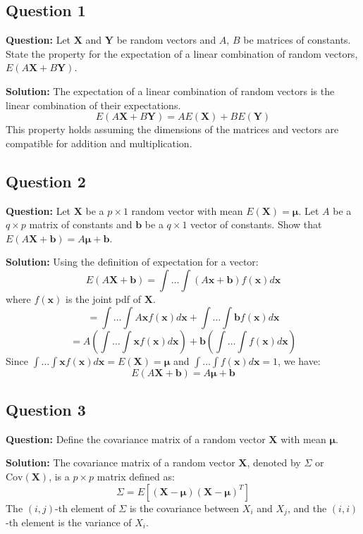 \subsection*{Question 1}
\textbf{Question:} Let $\mathbf{X}$ and $\mathbf{Y}$ be random vectors and $A$, $B$ be matrices of constants. State the property for the expectation of a linear combination of random vectors, $E(A\mathbf{X} + B\mathbf{Y})$.

\textbf{Solution:}
The expectation of a linear combination of random vectors is the linear combination of their expectations.
$$ E(A\mathbf{X} + B\mathbf{Y}) = A E(\mathbf{X}) + B E(\mathbf{Y}) $$
This property holds assuming the dimensions of the matrices and vectors are compatible for addition and multiplication.

\subsection*{Question 2}
\textbf{Question:} Let $\mathbf{X}$ be a $p \times 1$ random vector with mean $E(\mathbf{X}) = \boldsymbol{\mu}$. Let $A$ be a $q \times p$ matrix of constants and $\mathbf{b}$ be a $q \times 1$ vector of constants. Show that $E(A\mathbf{X} + \mathbf{b}) = A\boldsymbol{\mu} + \mathbf{b}$.

\textbf{Solution:}
Using the definition of expectation for a vector:
$$ E(A\mathbf{X} + \mathbf{b}) = \int \dots \int (A\mathbf{x} + \mathbf{b}) f(\mathbf{x}) d\mathbf{x} $$
where $f(\mathbf{x})$ is the joint pdf of $\mathbf{X}$.
$$ = \int \dots \int A\mathbf{x} f(\mathbf{x}) d\mathbf{x} + \int \dots \int \mathbf{b} f(\mathbf{x}) d\mathbf{x} $$
$$ = A \left( \int \dots \int \mathbf{x} f(\mathbf{x}) d\mathbf{x} \right) + \mathbf{b} \left( \int \dots \int f(\mathbf{x}) d\mathbf{x} \right) $$
Since $\int \dots \int \mathbf{x} f(\mathbf{x}) d\mathbf{x} = E(\mathbf{X}) = \boldsymbol{\mu}$ and $\int \dots \int f(\mathbf{x}) d\mathbf{x} = 1$, we have:
$$ E(A\mathbf{X} + \mathbf{b}) = A\boldsymbol{\mu} + \mathbf{b} $$

\subsection*{Question 3}
\textbf{Question:} Define the covariance matrix of a random vector $\mathbf{X}$ with mean $\boldsymbol{\mu}$.

\textbf{Solution:}
The covariance matrix of a random vector $\mathbf{X}$, denoted by $\Sigma$ or $\text{Cov}(\mathbf{X})$, is a $p \times p$ matrix defined as:
$$ \Sigma = E[(\mathbf{X} - \boldsymbol{\mu})(\mathbf{X} - \boldsymbol{\mu})^T] $$
The $(i, j)$-th element of $\Sigma$ is the covariance between $X_i$ and $X_j$, and the $(i, i)$-th element is the variance of $X_i$.

